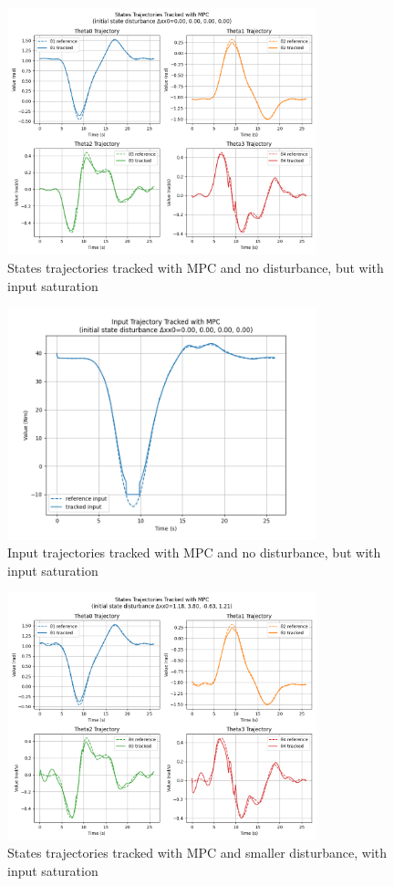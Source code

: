 \documentclass[a4paper,11pt,oneside]{book}
\begin{document}
\begin{figure}[H]
    \centering
    \includegraphics[width=0.8\textwidth]{State_tra_MPC_AD_T4.png}
    \caption{States trajectories tracked with MPC and no disturbance, but with input saturation}
    \label{fig:enter-label}
\end{figure}
\begin{figure}[H]
    \centering
    \includegraphics[width=0.8\textwidth]{Input_traj_MPC_AD_T4.png}
    \caption{Input trajectories tracked with MPC and no disturbance, but with input saturation}
    \label{fig:enter-label}
\end{figure}
\begin{figure}[H]
    \centering
    \includegraphics[width=0.8\textwidth]{State_traj_MPC_AD1_T4.png}
    \caption{States trajectories tracked with MPC and smaller disturbance, with input saturation}
    \label{fig:enter-label}
\end{figure}
\end{document}
